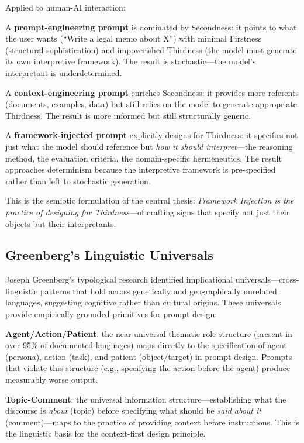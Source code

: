 \documentclass[12pt,a4paper]{article}
\begin{document}
Applied to human-AI interaction:

A \textbf{prompt-engineering prompt} is dominated by Secondness: it points to what the user wants (``Write a legal memo about X'') with minimal Firstness (structural sophistication) and impoverished Thirdness (the model must generate its own interpretive framework). The result is stochastic---the model's interpretant is underdetermined.

A \textbf{context-engineering prompt} enriches Secondness: it provides more referents (documents, examples, data) but still relies on the model to generate appropriate Thirdness. The result is more informed but still structurally generic.

A \textbf{framework-injected prompt} explicitly designs for Thirdness: it specifies not just what the model should reference but \emph{how it should interpret}---the reasoning method, the evaluation criteria, the domain-specific hermeneutics. The result approaches determinism because the interpretive framework is pre-specified rather than left to stochastic generation.

This is the semiotic formulation of the central thesis: \emph{Framework Injection is the practice of designing for Thirdness}---of crafting signs that specify not just their objects but their interpretants.

\subsection{Greenberg's Linguistic Universals}

Joseph Greenberg's typological research \cite{greenberg1963} identified implicational universals---cross-linguistic patterns that hold across genetically and geographically unrelated languages, suggesting cognitive rather than cultural origins. These universals provide empirically grounded primitives for prompt design:

\textbf{Agent/Action/Patient}: the near-universal thematic role structure (present in over 95\% of documented languages) maps directly to the specification of agent (persona), action (task), and patient (object/target) in prompt design. Prompts that violate this structure (e.g., specifying the action before the agent) produce measurably worse output.

\textbf{Topic-Comment}: the universal information structure---establishing what the discourse is \emph{about} (topic) before specifying what should be \emph{said about it} (comment)---maps to the practice of providing context before instructions. This is the linguistic basis for the context-first design principle.
\end{document}
